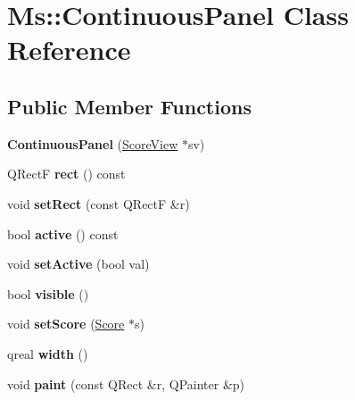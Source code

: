 \hypertarget{class_ms_1_1_continuous_panel}{}\section{Ms\+:\+:Continuous\+Panel Class Reference}
\label{class_ms_1_1_continuous_panel}
\subsection*{Public Member Functions}
\begin{DoxyCompactItemize}
\item 
\mbox{\label{class_ms_1_1_continuous_panel_aa95cef482f8b4f33e1b4bd8dfde89695}} 
{\bfseries Continuous\+Panel} (\hyperlink{class_ms_1_1_score_view}{Score\+View} $\ast$sv)
\item 
\mbox{\label{class_ms_1_1_continuous_panel_a81f2767aa774689dda0010b7dd993a48}} 
Q\+RectF {\bfseries rect} () const
\item 
\mbox{\label{class_ms_1_1_continuous_panel_a569ab471d87eac6f1adf5ae61c51edbc}} 
void {\bfseries set\+Rect} (const Q\+RectF \&r)
\item 
\mbox{\label{class_ms_1_1_continuous_panel_a861d7212d5384505072089663c95d48b}} 
bool {\bfseries active} () const
\item 
\mbox{\label{class_ms_1_1_continuous_panel_aa8ca054b2d65f491a2aca07031db3f45}} 
void {\bfseries set\+Active} (bool val)
\item 
\mbox{\label{class_ms_1_1_continuous_panel_a94e101c3d49b7a4f26cfcf007a4fe519}} 
bool {\bfseries visible} ()
\item 
\mbox{\label{class_ms_1_1_continuous_panel_ac4df23dd05d63e52b99b39254bf2473b}} 
void {\bfseries set\+Score} (\hyperlink{class_ms_1_1_score}{Score} $\ast$s)
\item 
\mbox{\label{class_ms_1_1_continuous_panel_a5313210b85be63d89b32a4d11c74889a}} 
qreal {\bfseries width} ()
\item 
\mbox{\label{class_ms_1_1_continuous_panel_a1eeb02a644acd9336a2ed9bf91a08fd9}} 
void {\bfseries paint} (const Q\+Rect \&r, Q\+Painter \&p)
\end{DoxyCompactItemize}


